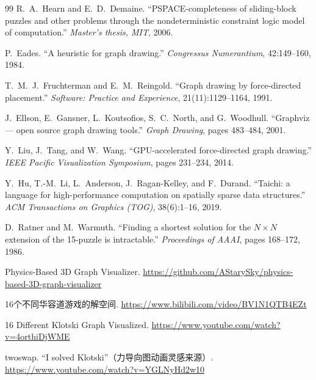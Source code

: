 \documentclass[11pt,a4paper]{report}
\begin{document}
\begin{thebibliography}{99}
R.~A.~Hearn and E.~D.~Demaine.
\newblock ``PSPACE-completeness of sliding-block puzzles and other problems
through the nondeterministic constraint logic model of computation.''
\newblock \textit{Master's thesis, MIT}, 2006.

P.~Eades.
\newblock ``A heuristic for graph drawing.''
\newblock \textit{Congressus Numerantium}, 42:149--160, 1984.

T.~M.~J.~Fruchterman and E.~M.~Reingold.
\newblock ``Graph drawing by force-directed placement.''
\newblock \textit{Software: Practice and Experience}, 21(11):1129--1164, 1991.

J.~Ellson, E.~Gansner, L.~Koutsofios, S.~C.~North, and G.~Woodhull.
\newblock ``Graphviz --- open source graph drawing tools.''
\newblock \textit{Graph Drawing}, pages 483--484, 2001.

Y.~Liu, J.~Tang, and W.~Wang.
\newblock ``GPU-accelerated force-directed graph drawing.''
\newblock \textit{IEEE Pacific Visualization Symposium}, pages 231--234, 2014.

Y.~Hu, T.-M.~Li, L.~Anderson, J.~Ragan-Kelley, and F.~Durand.
\newblock ``Taichi: a language for high-performance computation on
spatially sparse data structures.''
\newblock \textit{ACM Transactions on Graphics (TOG)}, 38(6):1--16, 2019.

D.~Ratner and M.~Warmuth.
\newblock ``Finding a shortest solution for the $N \times N$ extension of the
15-puzzle is intractable.''
\newblock \textit{Proceedings of AAAI}, pages 168--172, 1986.

Physics-Based 3D Graph Visualizer.
\newblock \url{https://github.com/AStarySky/physics-based-3D-graph-visualizer}

16个不同华容道游戏的解空间.
\newblock \url{https://www.bilibili.com/video/BV1N1QTB4EZt}

16 Different Klotski Graph Visualized.
\newblock \url{https://www.youtube.com/watch?v=4orthiDjWME}

twoswap.
\newblock ``I solved Klotski''（力导向图动画灵感来源）.
\newblock \url{https://www.youtube.com/watch?v=YGLNyHd2w10}
\end{thebibliography}
\end{document}
